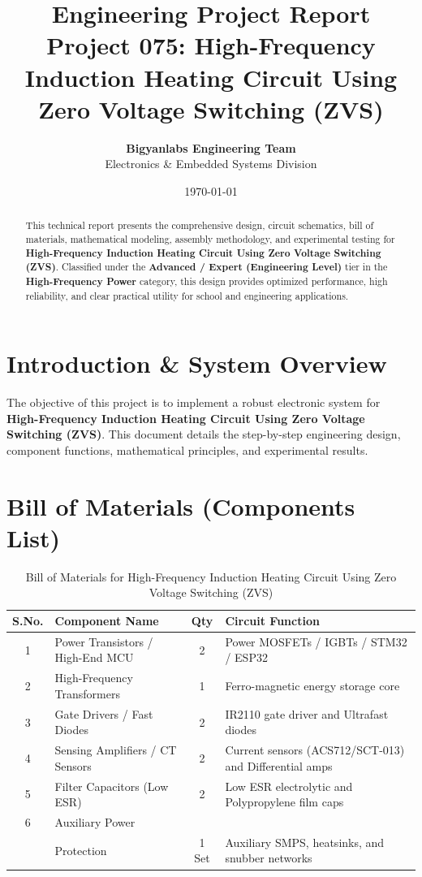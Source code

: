 \documentclass[11pt,a4paper]{article}
\title{\textbf{\Huge Engineering Project Report}\\[0.5em] \Large Project 075: High-Frequency Induction Heating Circuit Using Zero Voltage Switching (ZVS)}
\author{\textbf{Bigyanlabs Engineering Team}\\ Electronics \& Embedded Systems Division}
\date{\today}
\begin{document}
\maketitle
\thispagestyle{empty}

\begin{abstract}
This technical report presents the comprehensive design, circuit schematics, bill of materials, mathematical modeling, assembly methodology, and experimental testing for \textbf{High-Frequency Induction Heating Circuit Using Zero Voltage Switching (ZVS)}. Classified under the \textbf{Advanced / Expert (Engineering Level)} tier in the \textbf{High-Frequency Power} category, this design provides optimized performance, high reliability, and clear practical utility for school and engineering applications.
\end{abstract}

\newpage
\tableofcontents
\newpage

\section{Introduction \& System Overview}
The objective of this project is to implement a robust electronic system for \textbf{High-Frequency Induction Heating Circuit Using Zero Voltage Switching (ZVS)}. This document details the step-by-step engineering design, component functions, mathematical principles, and experimental results.

\section{Bill of Materials (Components List)}
\begin{table}[h!]
\centering
\caption{Bill of Materials for High-Frequency Induction Heating Circuit Using Zero Voltage Switching (ZVS)}
\vspace{0.5em}
\begin{tabular}{clcp{7cm}}
\toprule
\textbf{S.No.} & \textbf{Component Name} & \textbf{Qty} & \textbf{Circuit Function} \\
\midrule
1 & Power Transistors / High-End MCU & 2 & Power MOSFETs / IGBTs / STM32 / ESP32 \\
2 & High-Frequency Transformers & 1 & Ferro-magnetic energy storage core \\
3 & Gate Drivers / Fast Diodes & 2 & IR2110 gate driver and Ultrafast diodes \\
4 & Sensing Amplifiers / CT Sensors & 2 & Current sensors (ACS712/SCT-013) and Differential amps \\
5 & Filter Capacitors (Low ESR) & 2 & Low ESR electrolytic and Polypropylene film caps \\
6 & Auxiliary Power \\& Protection & 1 Set & Auxiliary SMPS, heatsinks, and snubber networks \\
\bottomrule
\end{tabular}
\end{table}
\end{document}
